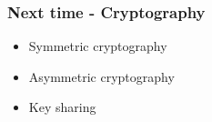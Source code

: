 \documentclass[
hyperref={pdfpagelabels=false}
,xcolor=table
]
{beamer}
\begin{document}
\begin{frame}
  \frametitle{Next time - Cryptography}
  \begin{itemize}
  \item Symmetric cryptography
  \item Asymmetric cryptography
  \item Key sharing
  \end{itemize}
  
\end{frame}
\end{document}
